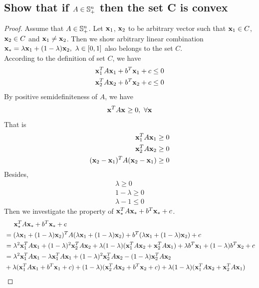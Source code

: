 \documentclass[11pt,a4paper]{article}
\begin{document}
\subsection{Show that if $A \in \mathbb{S}_{+}^{n}$ then the set C is convex}
\begin{proof}
    Assume that $A \in \mathbb{S}_{+}^{n}$.
    Let $\mathbf{x}_{1}$, $\mathbf{x}_{2}$ to be arbitrary vector such that $\mathbf{x}_{1} \in C$, $\mathbf{x}_{2}
    \in C$ and $\mathbf{x}_{1} \not = \mathbf{x}_{2}$.
    Then we show arbitrary linear combination $\mathbf{x}_{*} = \lambda \mathbf{x}_{1} + (1-\lambda) \mathbf{x}_{2},\ \lambda \in
    [0, 1]$ also belongs to the set $C$. \\
    According to the definition of set $C$, we have
    \begin{align}
        \mathbf{x}_{1}^{T} A \mathbf{x}_{1} + b^T \mathbf{x}_{1} + c \leq 0 \\
        \mathbf{x}_{2}^{T} A \mathbf{x}_{2} + b^T \mathbf{x}_{2} + c \leq 0
    \end{align}
    By positive semidefiniteness of $A$, we have
    \begin{align}
        \mathbf{x}_{}^{T} A \mathbf{x}_{} \geq 0,\ \forall \mathbf{x}_{}
    \end{align}
    That is 
    \begin{align}
        \mathbf{x}_{1}^{T} A \mathbf{x}_{1} \geq 0 \\ 
        \mathbf{x}_{2}^{T} A \mathbf{x}_{2} \geq 0 \\ 
        (\mathbf{x}_{2} - \mathbf{x}_{1})^{T} A (\mathbf{x}_{2} - \mathbf{x}_{1}) \geq 0 
    \end{align}
    Besides, 
    \begin{align}
        \lambda \geq 0 \\
        1 - \lambda  \geq 0 \\
        \lambda - 1 \leq 0
    \end{align}
    Then we investigate the property of $\mathbf{x}_{*}^{T} A \mathbf{x}_{*} + b^T \mathbf{x}_{*} + c$.
    \begin{align}
        & \hspace{0.5cm} \quacombo{\x{*}}  \\
        & = \quacombo{(\xcombo)} \\
        & = \lambda^2 \quadratic{\x{1}} + (1-\lambda)^2 \quadratic{\x{2}} 
        + \lambda(1-\lambda) (\nsquadratic{\x{1}}{\x{2}} + \nsquadratic{\x{2}}{\x{1}})
        + \lambda \linear{\x{1}} + (1-\lambda) \linear{\x{2}} + c \\
        & = \lambda^2 \quadratic{\x{1}} - \lambda \quadratic{\x{1}} 
        + (1-\lambda)^2 \quadratic{\x{2}} - (1-\lambda) \quadratic{\x{2}}
        \nonumber \\
        & + \lambda(\quacombo{\x{1}}) + (1-\lambda)(\quacombo{\x{2}}) 
        + \lambda(1-\lambda) (\nsquadratic{\x{1}}{\x{2}} + \nsquadratic{\x{2}}{\x{1}}) \\

\end{align}
\end{proof}
\end{document}
